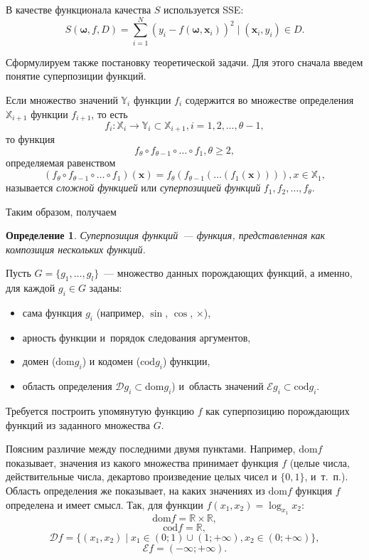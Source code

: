 \documentclass[12pt,a4paper]{article}
\newtheorem{defin}{Определение}
\begin{document}
В качестве функционала качества $S$ используется SSE:
\begin{equation}
  \label{eq:sse_expr}
  S(\boldsymbol{\omega}, f, D) = \sum_{i=1}^N (y_i - f (\boldsymbol{\omega}, \mathbf{x}_i))^2 \mid (\mathbf{x}_i, y_i) \in D.
\end{equation}

Сформулируем также постановку теоретической задачи. Для этого сначала
введем понятие суперпозиции функций.

Если множество значений $\mathbb{Y}_i$ функции $f_i$ содержится во множестве
определения $\mathbb{X}_{i+1}$ функции $f_{i+1}$, то есть
\[
f_i : \mathbb{X}_i \to \mathbb{Y}_i \subset \mathbb{X}_{i+1}, i = 1, 2, \dots, \theta - 1,
\]
то функция
\[
f_\theta \circ f_{\theta-1} \circ \dots \circ f_1, \theta \geq 2,
\]
определяемая равенством
\[
(f_\theta \circ f_{\theta-1} \circ \dots \circ f_1) (\mathbf{x}) =
  f_{\theta} (f_{\theta-1} (\dots (f_1 (\mathbf{x})))), x \in \mathbb{X}_1,
\]
называется \emph{сложной функцией}\cite{MathEnc1984_4} или
\emph{суперпозицией функций} $f_1, f_2, \dots, f_\theta$.

Таким образом, получаем
\begin{defin}
  Суперпозиция функций~--- функция, представленная как композиция нескольких
  функций. 
\end{defin}

Пусть $G = \{ g_1, \dots, g_l \}$~--- множество данных порождающих
функций, а именно, для каждой $g_i \in G$ заданы:
\begin{itemize}
  \item сама функция $g_i$ (например, $\sin$, $\cos$, $\times$),
  \item арность функции и~порядок следования аргументов,
  \item домен ($\text{dom} g_i$) и кодомен ($\text{cod} g_i$) функции,
  \item область определения $\mathcal{D} g_i \subset \text{dom} g_i$) и~область
	значений $\mathcal{E} g_i \subset \text{cod} g_i$.
\end{itemize}
Требуется построить упомянутую функцию $f$ как суперпозицию порождающих
функций из заданного множества $G$.

Поясним различие между последними двумя пунктами. Например, $\text{dom} f$
показывает, значения из какого множества принимает функция $f$ (целые числа,
действительные числа, декартово произведение целых чисел и $\{0, 1\}$,
и~т.~п.). Область определения же показывает, на каких значениях из
$\text{dom} f$ функция $f$ определена и имеет смысл. Так, для функции
$f(x_1, x_2) = \log_{x_1} x_2$:
\[
  \text{dom} f = \mathbb{R} \times \mathbb{R},
\]
\[
  \text{cod} f = \mathbb{R},
\]
\[
  \mathcal{D} f = \{ (x_1, x_2) \mid x_1 \in (0; 1) \cup (1; +\infty), x_2 \in (0; +\infty) \},
\]
\[
  \mathcal{E} f = (-\infty; +\infty).
\]
\end{document}
